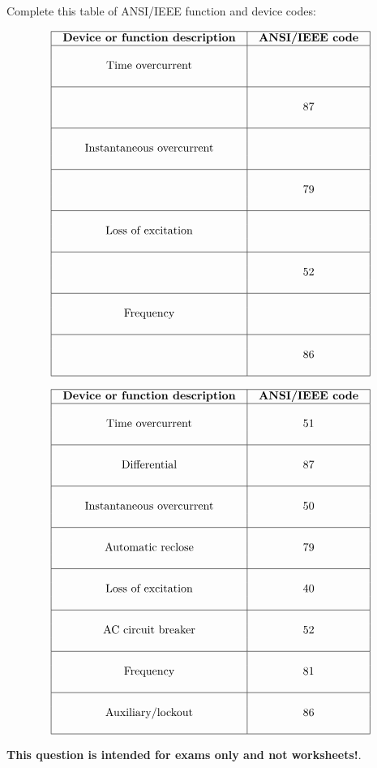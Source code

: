 

Complete this table of ANSI/IEEE function and device codes:


$$\vbox{\offinterlineskip
\halign{\strut
\vrule \quad\hfil # \ \hfil & 
\vrule \quad\hfil # \ \hfil \vrule \cr
\noalign{\hrule}
%
{\bf Device or function description} & {\bf ANSI/IEEE code} \cr
%
\noalign{\hrule}
%
 &  \cr
Time overcurrent &  \cr
 &  \cr
%
\noalign{\hrule}
%
 &  \cr
 & 87 \cr
 &  \cr
%
\noalign{\hrule}
%
 &  \cr
Instantaneous overcurrent &  \cr
 &  \cr
%
\noalign{\hrule}
%
 &  \cr
 & 79 \cr
 &  \cr
%
\noalign{\hrule}
%
 &  \cr
Loss of excitation &  \cr
 &  \cr
%
\noalign{\hrule}
%
 &  \cr
 & 52 \cr
 &  \cr
%
\noalign{\hrule}
%
 &  \cr
Frequency &  \cr
 &  \cr
%
\noalign{\hrule}
%
 &  \cr
 & 86 \cr
 &  \cr
%
\noalign{\hrule}
} %
}$$ %









$$\vbox{\offinterlineskip
\halign{\strut
\vrule \quad\hfil # \ \hfil & 
\vrule \quad\hfil # \ \hfil \vrule \cr
\noalign{\hrule}
%
{\bf Device or function description} & {\bf ANSI/IEEE code} \cr
%
\noalign{\hrule}
%
 &  \cr
Time overcurrent & 51 \cr
 &  \cr
%
\noalign{\hrule}
%
 &  \cr
Differential & 87 \cr
 &  \cr
%
\noalign{\hrule}
%
 &  \cr
Instantaneous overcurrent & 50 \cr
 &  \cr
%
\noalign{\hrule}
%
 &  \cr
Automatic reclose & 79 \cr
 &  \cr
%
\noalign{\hrule}
%
 &  \cr
Loss of excitation & 40 \cr
 &  \cr
%
\noalign{\hrule}
%
 &  \cr
AC circuit breaker & 52 \cr
 &  \cr
%
\noalign{\hrule}
%
 &  \cr
Frequency & 81 \cr
 &  \cr
%
\noalign{\hrule}
%
 &  \cr
Auxiliary/lockout & 86 \cr
 &  \cr
%
\noalign{\hrule}
} %
}$$ %







{\bf This question is intended for exams only and not worksheets!}.



